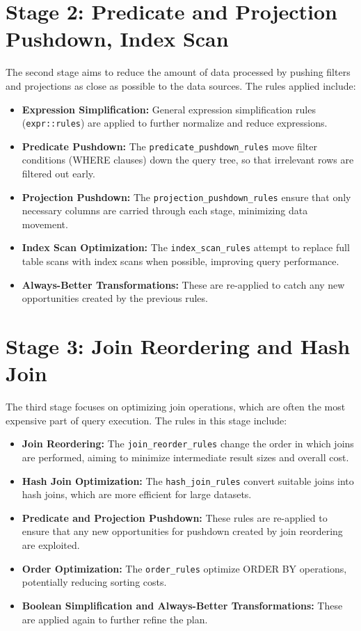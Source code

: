 \documentclass[a4paper,12pt]{scrreprt}
\begin{document}
\section{Stage 2: Predicate and Projection Pushdown, Index Scan}
The second stage aims to reduce the amount of data processed by pushing filters and projections as close as possible to the data sources. The rules applied include:
\begin{itemize}
    \item \textbf{Expression Simplification:} General expression simplification rules (\texttt{expr::rules}) are applied to further normalize and reduce expressions.
    \item \textbf{Predicate Pushdown:} The \texttt{predicate\_pushdown\_rules} move filter conditions (WHERE clauses) down the query tree, so that irrelevant rows are filtered out early.
    \item \textbf{Projection Pushdown:} The \texttt{projection\_pushdown\_rules} ensure that only necessary columns are carried through each stage, minimizing data movement.
    \item \textbf{Index Scan Optimization:} The \texttt{index\_scan\_rules} attempt to replace full table scans with index scans when possible, improving query performance.
    \item \textbf{Always-Better Transformations:} These are re-applied to catch any new opportunities created by the previous rules.
\end{itemize}

\section{Stage 3: Join Reordering and Hash Join}
The third stage focuses on optimizing join operations, which are often the most expensive part of query execution. The rules in this stage include:
\begin{itemize}
    \item \textbf{Join Reordering:} The \texttt{join\_reorder\_rules} change the order in which joins are performed, aiming to minimize intermediate result sizes and overall cost.
    \item \textbf{Hash Join Optimization:} The \texttt{hash\_join\_rules} convert suitable joins into hash joins, which are more efficient for large datasets.
    \item \textbf{Predicate and Projection Pushdown:} These rules are re-applied to ensure that any new opportunities for pushdown created by join reordering are exploited.
    \item \textbf{Order Optimization:} The \texttt{order\_rules} optimize ORDER BY operations, potentially reducing sorting costs.
    \item \textbf{Boolean Simplification and Always-Better Transformations:} These are applied again to further refine the plan.
\end{itemize}
\end{document}
